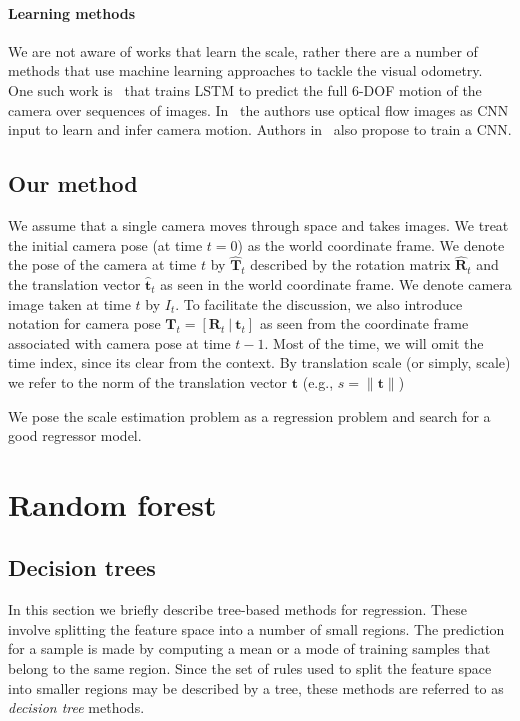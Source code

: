 \paragraph{Learning methods} We are not aware of works that learn the
scale, rather there are a number of methods that use machine learning
approaches to tackle the visual odometry.  One such work
is~\cite{wang2017deepvo} that trains LSTM to predict the full 6-DOF
motion of the camera over sequences of
images. In~\cite{muller20017flowdometry} the authors use optical flow
images as CNN input to learn and infer camera motion. Authors
in~\cite{DBLP:journals/corr/MohantyADGSC16} also propose to train a
CNN.



\subsection{Our method}

We assume that a single camera moves through space and takes images.
We treat the initial camera pose (at time $t=0$) as the world
coordinate frame.  We denote the pose of the camera at time $t$ by
$\mathbf{\hat{T}}_t$ described by the rotation matrix
$\mathbf{\hat{R}}_t$ and the translation vector $\mathbf{\hat{t}}_t$
as seen in the world coordinate frame.  We denote camera image taken
at time $t$ by $I_t$.  To facilitate the discussion, we also introduce
notation for camera pose
$\mathbf{T}_t = [\mathbf{R}_t\ |\ \mathbf{t}_t] $ as seen from the
coordinate frame associated with camera pose at time $t-1$.  Most of
the time, we will omit the time index, since its clear from the
context.  By translation scale (or simply, scale) we refer to the norm
of the translation vector $\mathbf{t}$ (e.g.,
$s = \lVert \mathbf{t} \rVert$)

We pose the scale estimation problem as a regression problem and
search for a good regressor model.

\section{Random forest}

\subsection{Decision trees}

In this section we briefly describe tree-based methods for regression.
These involve splitting the feature space into a number of small
regions.  The prediction for a sample is made by computing a mean or a
mode of training samples that belong to the same region.  Since the
set of rules used to split the feature space into smaller regions may
be described by a tree, these methods are referred to as
\textit{decision tree} methods.

